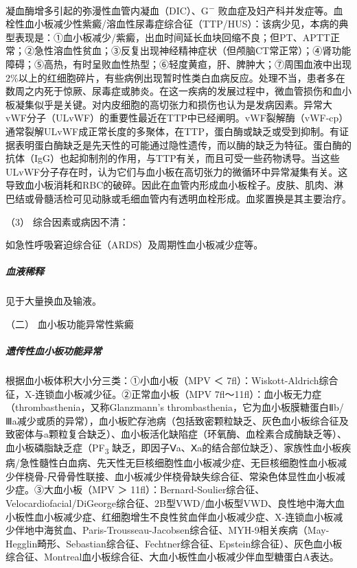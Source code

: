 凝血酶增多引起的弥漫性血管内凝血（DIC）、G\textsuperscript{−}
败血症及妇产科并发症等。血栓性血小板减少性紫癜/溶血性尿毒症综合征（TTP/HUS）：该病少见，本病的典型表现是：①血小板减少/紫癜，出血时间延长血块回缩不良；但PT、APTT正常；②急性溶血性贫血；③反复出现神经精神症状（但颅脑CT常正常）；④肾功能障碍；⑤高热，有时呈败血性热型；⑥轻度黄疸，肝、脾肿大；⑦周围血液中出现2\%以上的红细胞碎片，有些病例出现暂时性类白血病反应。处理不当，患者多在数周之内死于惊厥、尿毒症或肺炎。在这一疾病的发展过程中，微血管损伤和血小板凝集似乎是关键。对内皮细胞的高切张力和损伤也认为是发病因素。异常大vWF分子（ULvWF）的重要性最近在TTP中已经阐明。vWF裂解酶（vWF-cp）通常裂解ULvWF成正常长度的多聚体，在TTP，蛋白酶或缺乏或受到抑制。有证据表明蛋白酶缺乏是先天性的可能通过隐性遗传，而以酶的缺乏为特征。蛋白酶的抗体（IgG）也起抑制剂的作用，与TTP有关，而且可受一些药物诱导。当这些ULvWF分子存在时，认为它们与血小板在高切张力的微循环中异常凝集有关。这导致血小板消耗和RBC的破碎。因此在血管内形成血小板栓子。皮肤、肌肉、淋巴结或骨髓活检可见动脉或毛细血管内有透明血栓形成。血浆置换是其主要治疗。

\hypertarget{text00036.htmlux5cux23CHP1-14-1-2-1-5-3}{}
（3） 综合因素或病因不清：

如急性呼吸窘迫综合征（ARDS）及周期性血小板减少症等。

\subparagraph{血液稀释}

见于大量换血及输液。

\hypertarget{text00036.htmlux5cux23CHP1-14-1-2-2}{}
（二） 血小板功能异常性紫癜

\subparagraph{遗传性血小板功能异常}

根据血小板体积大小分三类：①小血小板（MPV ＜
7fl）：Wiskott-Aldrich综合征，X-连锁血小板减少征。②正常血小板（MPV
7fl～11fl）：血小板无力症（thrombasthenia，又称Glanzmann's
thrombasthenia，它为血小板膜糖蛋白Ⅱb/Ⅲa减少或质的异常），血小板贮存池病（包括致密颗粒缺乏、灰色血小板综合征及致密体与a颗粒复合缺乏）、血小板活化缺陷症（环氧酶、血栓素合成酶缺乏等）、血小板磷脂缺乏症（PF\textsubscript{3}
缺乏，即因子Ⅴa、Ⅹa的结合部位缺乏）、家族性血小板疾病/急性髓性白血病、先天性无巨核细胞性血小板减少症、无巨核细胞性血小板减少伴桡骨-尺骨骨性联接、血小板减少伴桡骨缺失综合征、常染色体显性血小板减少症。③大血小板（MPV
＞
11fl）：Bernard-Soulier综合征、Velocardiofacial/DiGeorge综合征、2B型VWD/血小板型VWD、良性地中海大血小板性血小板减少症、红细胞增生不良性贫血伴血小板减少症、X-连锁血小板减少伴地中海贫血、Paris-Trousseau-Jacobsen综合征、MYH-9相关疾病（May-Hegglin畸形、Sebastian综合征、Fechtner综合征、Epstein综合征）、灰色血小板综合征、Montreal血小板综合征、大血小板性血小板减少伴血型糖蛋白A表达。

